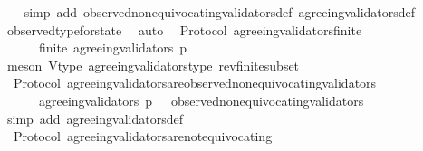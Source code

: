 \begin{isabellebody}
%
\isadelimproof
\ \ %
\endisadelimproof
%
\isatagproof
{}\isamarkupfalse%
\ {\isacharparenleft}simp\ add{\isacharcolon}\ observed{\isacharunderscore}non{\isacharunderscore}equivocating{\isacharunderscore}validators{\isacharunderscore}def\ agreeing{\isacharunderscore}validators{\isacharunderscore}def{\isacharparenright}\isanewline
\ \ \isamarkupfalse%
\ observed{\isacharunderscore}type{\isacharunderscore}for{\isacharunderscore}state\ \isamarkupfalse%
\ auto%
\endisatagproof
{\isafoldproof}%
%
\isadelimproof
\isanewline
%
\endisadelimproof
\isanewline
{}\isamarkupfalse%
\ {\isacharparenleft}\ Protocol{\isacharparenright}\ agreeing{\isacharunderscore}validators{\isacharunderscore}finite\ {\isacharcolon}\isanewline
\ \ {\isachardoublequoteopen}{\isasymforall}\ {\isasymsigma}\ {\isasymin}\ {\isasymSigma}{\isachardot}\ finite\ {\isacharparenleft}agreeing{\isacharunderscore}validators\ {\isacharparenleft}p{\isacharcomma}\ {\isasymsigma}{\isacharparenright}{\isacharparenright}{\isachardoublequoteclose}\isanewline
%
\isadelimproof
\ \ %
\endisadelimproof
%
\isatagproof
{}\isamarkupfalse%
\ {\isacharparenleft}meson\ V{\isacharunderscore}type\ agreeing{\isacharunderscore}validators{\isacharunderscore}type\ rev{\isacharunderscore}finite{\isacharunderscore}subset{\isacharparenright}%
\endisatagproof
{\isafoldproof}%
%
\isadelimproof
\isanewline
%
\endisadelimproof
\isanewline
{}\isamarkupfalse%
\ {\isacharparenleft}\ Protocol{\isacharparenright}\ agreeing{\isacharunderscore}validators{\isacharunderscore}are{\isacharunderscore}observed{\isacharunderscore}non{\isacharunderscore}equivocating{\isacharunderscore}validators\ {\isacharcolon}\isanewline
\ \ {\isachardoublequoteopen}{\isasymforall}\ {\isasymsigma}\ {\isasymin}\ {\isasymSigma}{\isachardot}\ agreeing{\isacharunderscore}validators\ {\isacharparenleft}p{\isacharcomma}\ {\isasymsigma}{\isacharparenright}\ {\isasymsubseteq}\ observed{\isacharunderscore}non{\isacharunderscore}equivocating{\isacharunderscore}validators\ {\isasymsigma}{\isachardoublequoteclose}\isanewline
%
\isadelimproof
\ \ %
\endisadelimproof
%
\isatagproof
{}\isamarkupfalse%
\ {\isacharparenleft}simp\ add{\isacharcolon}\ agreeing{\isacharunderscore}validators{\isacharunderscore}def{\isacharparenright}%
\endisatagproof
{\isafoldproof}%
%
\isadelimproof
\isanewline
%
\endisadelimproof
\isanewline
{}\isamarkupfalse%
\ {\isacharparenleft}\ Protocol{\isacharparenright}\ agreeing{\isacharunderscore}validators{\isacharunderscore}are{\isacharunderscore}not{\isacharunderscore}equivocating\ {\isacharcolon}\isanewline

\end{isabellebody}
